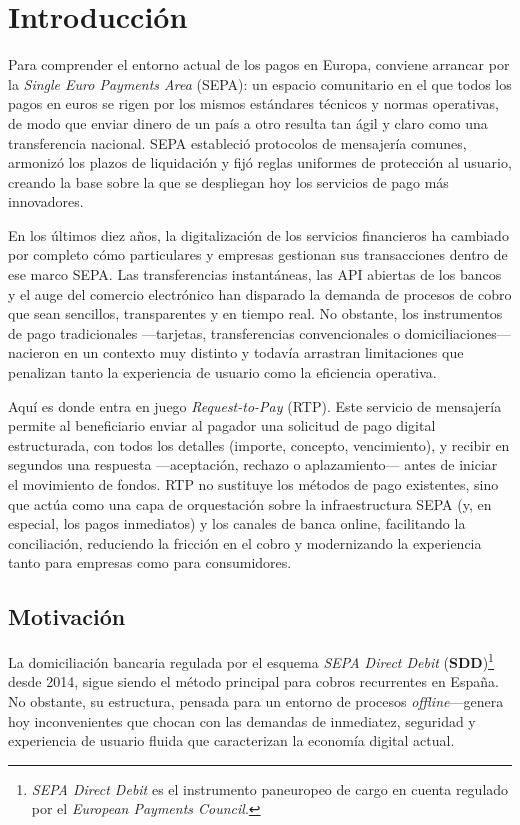 \section{Introducción}
\label{sec:Introduccion}

Para comprender el entorno actual de los pagos en Europa, conviene arrancar por la \emph{Single Euro Payments Area} (SEPA): un espacio comunitario en el que todos los pagos en euros se rigen por los mismos estándares técnicos y normas operativas, de modo que enviar dinero de un país a otro resulta tan ágil y claro como una transferencia nacional. SEPA estableció protocolos de mensajería comunes, armonizó los plazos de liquidación y fijó reglas uniformes de protección al usuario, creando la base sobre la que se despliegan hoy los servicios de pago más innovadores.

En los últimos diez años, la digitalización de los servicios financieros ha cambiado por completo cómo particulares y empresas gestionan sus transacciones dentro de ese marco SEPA. Las transferencias instantáneas, las API abiertas de los bancos y el auge del comercio electrónico han disparado la demanda de procesos de cobro que sean sencillos, transparentes y en tiempo real. No obstante, los instrumentos de pago tradicionales —tarjetas, transferencias convencionales o domiciliaciones— nacieron en un contexto muy distinto y todavía arrastran limitaciones que penalizan tanto la experiencia de usuario como la eficiencia operativa.

Aquí es donde entra en juego \emph{Request-to-Pay} (RTP). Este servicio de mensajería permite al beneficiario enviar al pagador una solicitud de pago digital estructurada, con todos los detalles (importe, concepto, vencimiento), y recibir en segundos una respuesta —aceptación, rechazo o aplazamiento— antes de iniciar el movimiento de fondos. RTP no sustituye los métodos de pago existentes, sino que actúa como una capa de orquestación sobre la infraestructura SEPA (y, en especial, los pagos inmediatos) y los canales de banca online, facilitando la conciliación, reduciendo la fricción en el cobro y modernizando la experiencia tanto para empresas como para consumidores.

\subsection{Motivación}
\label{subsec:Motivacion}

La domiciliación bancaria regulada por el esquema \textit{SEPA Direct Debit} (\textbf{SDD})\footnote{\textit{SEPA Direct Debit} es el instrumento paneuropeo de cargo en cuenta regulado por el \emph{European Payments Council}.} desde 2014, sigue siendo el método principal para cobros recurrentes en España. No obstante, su estructura, pensada para un entorno de procesos \emph{offline}—genera hoy inconvenientes que chocan con las demandas de inmediatez, seguridad y experiencia de usuario fluida que caracterizan la economía digital actual.

